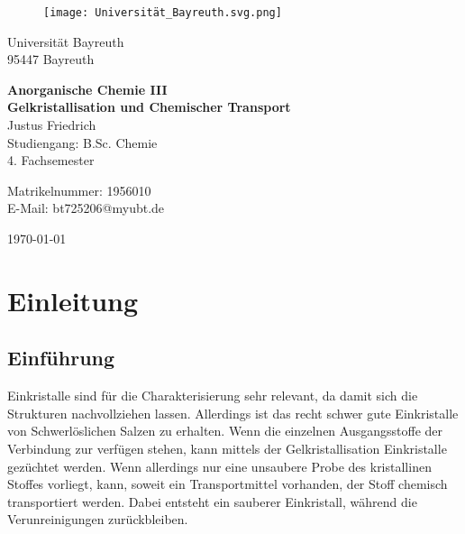 \documentclass[12pt, a4paper]{article}
\begin{document}
\begin{figure}
    \texttt{[image: Universität\_Bayreuth.svg.png]}
\end{figure}



{\raggedright Universität Bayreuth\\  95447 Bayreuth}


\vspace{5cm}

\begin{center}
{\LARGE\bf{Anorganische Chemie III}} \\  
\vspace{1cm}
{\Large\bf{Gelkristallisation und Chemischer Transport}}\\
\vspace{0.5cm}
{\large Justus Friedrich\\}
{Studiengang: B.Sc. Chemie\\}
{4. Fachsemester}
\end{center}





\thispagestyle{empty}
\begin{center}
{\small Matrikelnummer: 1956010 \\
E-Mail:  bt725206@myubt.de}
\end{center}

\vspace{5cm}
\begin{center}
  \today
\end{center}



\newpage
\tableofcontents
\thispagestyle{empty}


\newpage
\setcounter{page}{1}
\section{Einleitung}



\subsection{Einführung}
{Einkristalle sind für die Charakterisierung sehr relevant, da damit sich die Strukturen nachvollziehen lassen. Allerdings ist das recht 
schwer gute Einkristalle von Schwerlöslichen Salzen zu erhalten. Wenn die einzelnen Ausgangsstoffe der Verbindung zur verfügen stehen, kann mittels 
der Gelkristallisation Einkristalle gezüchtet werden. Wenn allerdings nur eine unsaubere Probe des kristallinen Stoffes vorliegt, kann, soweit ein Transportmittel vorhanden, 
der Stoff chemisch transportiert werden. Dabei entsteht ein sauberer Einkristall, während die Verunreinigungen zurückbleiben.
}
\end{document}

